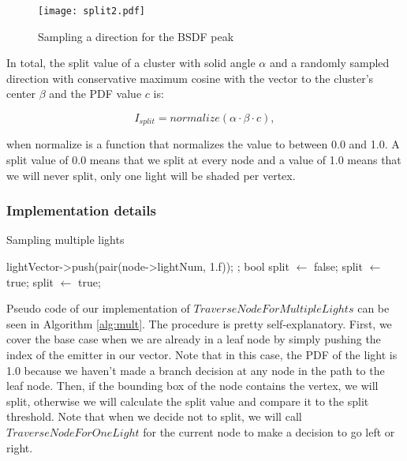 \begin{figure}
	\begin{center}
		\texttt{[image: split2.pdf]}
		\caption{Sampling a direction for the BSDF peak}
		\label{fig:split2}
	\end{center}
\end{figure}

In total, the split value of a cluster with solid angle $\alpha$ and a randomly sampled direction with conservative maximum cosine with the vector to the cluster's center $\beta$ and the PDF value $c$ is:

\begin{equation}
I_{split} = normalize(\alpha \cdot \beta \cdot c),
\end{equation}

when normalize is a function that normalizes the value to between 0.0 and 1.0. A split value of 0.0 means that we split at every node and a value of 1.0 means that we will never split, only one light will be shaded per vertex.

\newpage

\subsubsection{Implementation details}

\begin{algorithm}
	\caption{Sampling multiple lights}
	\label{alg:mult}
\begin{algorithmic}[1] %
	\State lightVector->push(pair(node->lightNum, 1.f));
	\State \Return;
	\EndIf
	\State bool split $\gets$ false;
	\State split $\gets$ true;
	\Else
	\State <approximate solid angle>
	\State <sample random direction and calculate BSDF peak>
	\State <calculate normalized split value>
	\State split $\gets$ true;
	\EndIf
	\EndIf
	\State <recursively traverse left and right child>
	\Else
	\State <call TraverseNodeForOneLight for current node and store return in vector>
	\EndIf
	\EndProcedure
\end{algorithmic}
\end{algorithm}

Pseudo code of our implementation of $TraverseNodeForMultipleLights$ can be seen in Algorithm \ref{alg:mult}. The procedure is pretty self-explanatory. First, we cover the base case when we are already in a leaf node by simply pushing the index of the emitter in our vector. Note that in this case, the PDF of the light is 1.0 because we haven't made a branch decision at any node in the path to the leaf node. Then, if the bounding box of the node contains the vertex, we will split, otherwise we will calculate the split value and compare it to the split threshold. Note that when we decide not to split, we will call $TraverseNodeForOneLight$ for the current node to make a decision to go left or right. 

